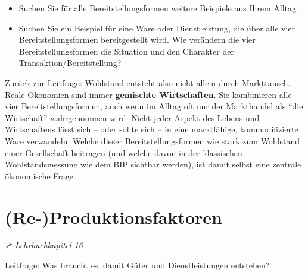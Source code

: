 \documentclass[
  nswissgerman,
  a4paper,
  DIV=11,
  numbers=noendperiod,
  oneside,
  openany]{scrreprt}
\providecommand{\tightlist}{%
  \setlength{\itemsep}{0pt}\setlength{\parskip}{0pt}}
\begin{document}
\begin{tcolorbox}[enhanced jigsaw, arc=.35mm, bottomrule=.15mm, bottomtitle=1mm, breakable, colback=white, colbacktitle=quarto-callout-note-color!10!white, colframe=quarto-callout-note-color-frame, coltitle=black, left=2mm, leftrule=.75mm, opacityback=0, opacitybacktitle=0.6, rightrule=.15mm, title={Vertiefungsfragen}, titlerule=0mm, toprule=.15mm, toptitle=1mm]

\begin{itemize}
\tightlist
\item
  Suchen Sie für alle Bereitstellungsformen weitere Beispiele aus Ihrem
  Alltag.
\item
  Suchen Sie ein Beispiel für eine Ware oder Dienstleistung, die über
  alle vier Bereitstellungsformen bereitgestellt wird. Wie verändern die
  vier Bereitstellungsformen die Situation und den Charakter der
  Transaktion/Bereitstellung?
\end{itemize}

\end{tcolorbox}

Zurück zur Leitfrage: Wohlstand entsteht also nicht allein durch
Markttausch. Reale Ökonomien sind immer \textbf{gemischte Wirtschaften}.
Sie kombinieren alle vier Bereitstellungsformen, auch wenn im Alltag oft
nur der Markthandel als ``die Wirtschaft'' wahrgenommen wird. Nicht
jeder Aspekt des Lebens und Wirtschaftens lässt sich -- oder sollte sich
-- in eine marktfähige, kommodifizierte Ware verwandeln. Welche dieser
Bereitstellungsformen wie stark zum Wohlstand einer Gesellschaft
beitragen (und welche davon in der klassischen Wohlstandsmessung wie dem
BIP sichtbar werden), ist damit selbst eine zentrale ökonomische Frage.

\section{(Re-)Produktionsfaktoren}\label{re-produktionsfaktoren}

\emph{↗ Lehrbuchkapitel 16}

\begin{tcolorbox}[enhanced jigsaw, arc=.35mm, bottomrule=.15mm, bottomtitle=1mm, breakable, colback=white, colbacktitle=quarto-callout-note-color!10!white, colframe=quarto-callout-note-color-frame, coltitle=black, left=2mm, leftrule=.75mm, opacityback=0, opacitybacktitle=0.6, rightrule=.15mm, title={Leitfrage}, titlerule=0mm, toprule=.15mm, toptitle=1mm]

Leitfrage: Was braucht es, damit Güter und Dienstleistungen entstehen?

\end{tcolorbox}
\end{document}
